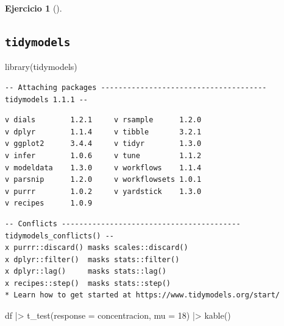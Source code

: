 \documentclass[
  a4paper,
]{scrreport}
\newenvironment{Shaded}{\begin{snugshade}}{\end{snugshade}}
\newcommand{\AttributeTok}[1]{\textcolor[rgb]{0.40,0.45,0.13}{#1}}
\newcommand{\DecValTok}[1]{\textcolor[rgb]{0.68,0.00,0.00}{#1}}
\newcommand{\FunctionTok}[1]{\textcolor[rgb]{0.28,0.35,0.67}{#1}}
\newcommand{\NormalTok}[1]{\textcolor[rgb]{0.00,0.23,0.31}{#1}}
\newcommand{\SpecialCharTok}[1]{\textcolor[rgb]{0.37,0.37,0.37}{#1}}
\theoremstyle{definition}
\newtheorem{exercise}{Ejercicio}[chapter]
\theoremstyle{remark}
\begin{document}
\begin{exercise}[]
\begin{enumerate}
\begin{tcolorbox}
  \section{\texorpdfstring{\texttt{tidymodels}}{tidymodels}}

\begin{Shaded}
\begin{Highlighting}[]
\FunctionTok{library}\NormalTok{(tidymodels)}
\end{Highlighting}
\end{Shaded}

\begin{verbatim}
-- Attaching packages -------------------------------------- tidymodels 1.1.1 --
\end{verbatim}

\begin{verbatim}
v dials        1.2.1     v rsample      1.2.0
v dplyr        1.1.4     v tibble       3.2.1
v ggplot2      3.4.4     v tidyr        1.3.0
v infer        1.0.6     v tune         1.1.2
v modeldata    1.3.0     v workflows    1.1.4
v parsnip      1.2.0     v workflowsets 1.0.1
v purrr        1.0.2     v yardstick    1.3.0
v recipes      1.0.9     
\end{verbatim}

\begin{verbatim}
-- Conflicts ----------------------------------------- tidymodels_conflicts() --
x purrr::discard() masks scales::discard()
x dplyr::filter()  masks stats::filter()
x dplyr::lag()     masks stats::lag()
x recipes::step()  masks stats::step()
* Learn how to get started at https://www.tidymodels.org/start/
\end{verbatim}

\begin{Shaded}
\begin{Highlighting}[]
\NormalTok{df }\SpecialCharTok{|\textgreater{}} 
    \FunctionTok{t\_test}\NormalTok{(}\AttributeTok{response =}\NormalTok{ concentracion, }\AttributeTok{mu =} \DecValTok{18}\NormalTok{) }\SpecialCharTok{|\textgreater{}} 
    \FunctionTok{kable}\NormalTok{() }
\end{Highlighting}
\end{Shaded}


\end{tcolorbox}
\end{enumerate}
\end{exercise}
\end{document}
